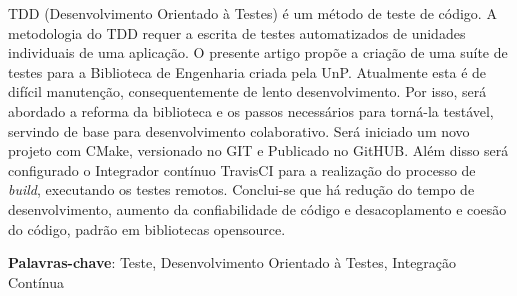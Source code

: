 \documentclass[
	article,			%
	12pt,				%
	oneside,			%
	a4paper,			%
	english,			
	brazil,
	sumario=tradicional
	]{abntex2}
\begin{document}

\frenchspacing 


%
%
\maketitle

\begin{resumoumacoluna}
TDD (Desenvolvimento Orientado à Testes) é um método de teste de código. A metodologia do TDD requer a escrita de testes automatizados de unidades individuais de uma aplicação.
O presente artigo propõe a criação de uma suíte de testes para a Biblioteca de Engenharia criada pela UnP. Atualmente esta é de difícil manutenção, consequentemente de lento desenvolvimento. Por isso, será abordado a reforma da biblioteca e os passos necessários para torná-la testável, servindo de base para desenvolvimento colaborativo. Será iniciado um novo projeto com CMake, versionado no GIT e Publicado no GitHUB. Além disso será configurado o Integrador contínuo TravisCI para a realização do processo de \textit{build}, executando os testes remotos. Conclui-se que há redução do tempo de desenvolvimento, aumento da confiabilidade de código e desacoplamento e coesão do código, padrão em bibliotecas opensource.

 \vspace{\onelineskip}
 
 \noindent
 \textbf{Palavras-chave}: Teste, Desenvolvimento Orientado à Testes, Integração Contínua
\end{resumoumacoluna}
\end{document}
